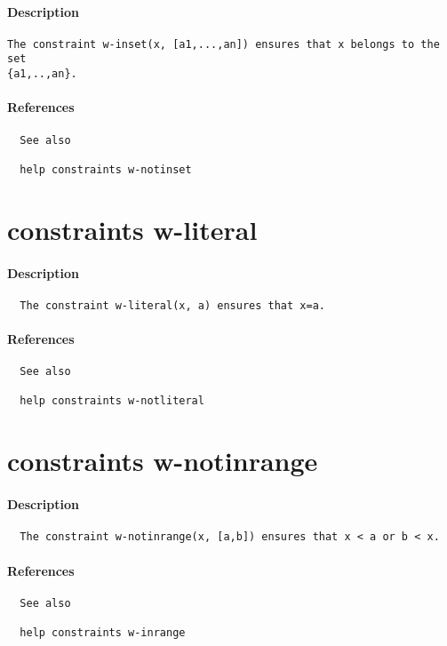 \paragraph{Description}
{\footnotesize
\begin{verbatim}
The constraint w-inset(x, [a1,...,an]) ensures that x belongs to the set 
{a1,..,an}.
\end{verbatim}
}
\paragraph{References}
{\footnotesize
\begin{verbatim}
  See also

  help constraints w-notinset
\end{verbatim}
}
\section{constraints w-literal}
\paragraph{Description}
{\footnotesize
\begin{verbatim}
  The constraint w-literal(x, a) ensures that x=a.
\end{verbatim}
}
\paragraph{References}
{\footnotesize
\begin{verbatim}
  See also

  help constraints w-notliteral
\end{verbatim}
}
\section{constraints w-notinrange}
\paragraph{Description}
{\footnotesize
\begin{verbatim}
  The constraint w-notinrange(x, [a,b]) ensures that x < a or b < x.
\end{verbatim}
}
\paragraph{References}
{\footnotesize
\begin{verbatim}
  See also

  help constraints w-inrange
\end{verbatim}
}
